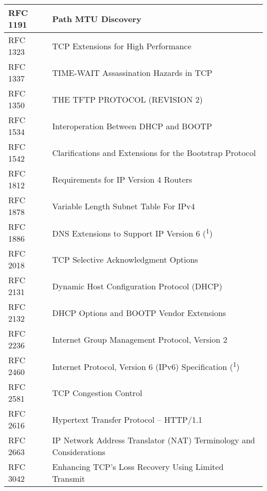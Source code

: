 \begin{longtable}{ | l | p{15cm} | }
RFC 1191 &
Path MTU Discovery \\ \hline

RFC 1323 &
TCP Extensions for High Performance \\ \hline

RFC 1337 &
TIME-WAIT Assassination Hazards in TCP \\ \hline

RFC 1350 &
THE TFTP PROTOCOL (REVISION 2) \\ \hline

RFC 1534 &
Interoperation Between DHCP and BOOTP \\ \hline

RFC 1542 &
Clarifications and Extensions for the Bootstrap Protocol \\ \hline

RFC 1812 &
Requirements for IP Version 4 Routers \\ \hline

RFC 1878 &
Variable Length Subnet Table For IPv4 \\ \hline

RFC 1886 &
DNS Extensions to Support IP Version 6 (\textsuperscript{1}) \\ \hline

RFC 2018 &
TCP Selective Acknowledgment Options \\ \hline

RFC 2131 &
Dynamic Host Configuration Protocol (DHCP) \\ \hline

RFC 2132 &
DHCP Options and BOOTP Vendor Extensions \\ \hline

RFC 2236 &
Internet Group Management Protocol, Version 2 \\ \hline

RFC 2460 &
Internet Protocol, Version 6 (IPv6) Specification (\textsuperscript{1}) \\ \hline

RFC 2581 &
TCP Congestion Control \\ \hline

RFC 2616 &
Hypertext Transfer Protocol -- HTTP/1.1 \\ \hline

RFC 2663 &
IP Network Address Translator (NAT) Terminology and Considerations \\ \hline

RFC 3042 &
Enhancing TCP's Loss Recovery Using Limited Transmit \\ \hline


\end{longtable}
